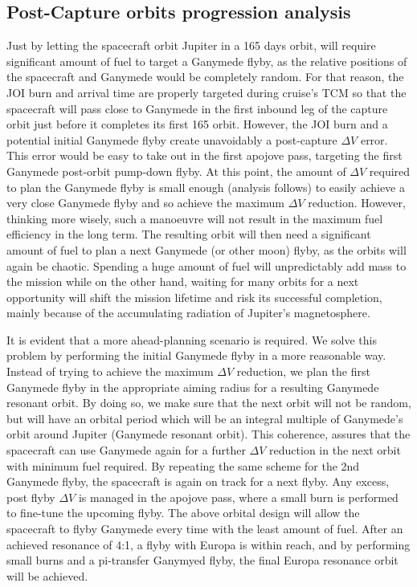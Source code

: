\subsection{Post-Capture orbits progression analysis}
Just by letting the spacecraft orbit Jupiter in a 165 days orbit, will require significant amount of fuel to target a Ganymede flyby, as the relative positions of the spacecraft and Ganymede would be completely random. For that reason, the JOI burn and arrival time are properly targeted during cruise's TCM so that the spacecraft will pass close to Ganymede in the first inbound leg of the capture orbit just before it completes its first 165 orbit. However, the JOI burn and a potential initial Ganymede flyby create unavoidably a post-capture $\Delta V$ error. This  error would be easy to take out in the first apojove pass, targeting the first Ganymede post-orbit pump-down flyby. At this point, the amount of $\Delta V$ required to plan the Ganymede flyby is small enough (analysis follows) to easily achieve a very close Ganymede flyby and so achieve the maximum $\Delta V$ reduction. However, thinking more wisely, such a manoeuvre will not result in the maximum fuel efficiency in the long term. The resulting orbit will then need a significant amount of fuel to plan a next Ganymede (or other moon) flyby, as the orbits will again be chaotic. Spending a huge amount of fuel will unpredictably add mass to the mission while on the other hand, waiting for many orbits for a next opportunity will shift the mission lifetime and risk its successful completion, mainly because of the accumulating radiation of Jupiter's magnetosphere.

It is evident that a more ahead-planning scenario is required. We solve this problem by performing the initial Ganymede flyby in a more reasonable way. Instead of trying to achieve the maximum $\Delta V$ reduction, we plan the first Ganymede flyby in the appropriate aiming radius for a resulting Ganymede resonant orbit. By doing so, we make sure that the next orbit will not be random, but will have an orbital period which will be an integral multiple of Ganymede's orbit around Jupiter (Ganymede resonant orbit). This coherence, assures that the spacecraft can use Ganymede again for a further $\Delta V$ reduction in the next orbit with minimum fuel required. By repeating the same scheme for the 2nd Ganymede flyby, the spacecraft is again on track for a next flyby. Any excess, post flyby $\Delta V$ is managed in the apojove pass, where a small burn is performed to fine-tune the upcoming flyby. The above orbital design will allow the spacecraft to flyby Ganymede every time with the least amount of fuel. After an achieved resonance of 4:1, a flyby with Europa is within reach, and by performing small burns and a pi-transfer Ganymyed flyby, the final Europa resonance orbit will be achieved. 
